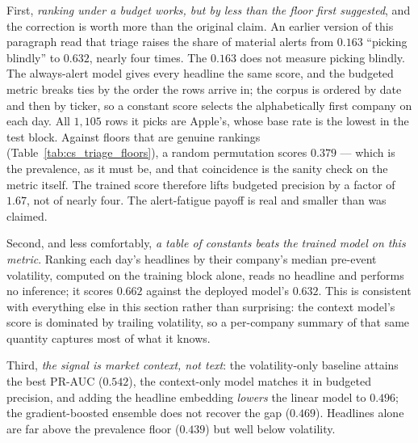 First, \emph{ranking under a budget works, but by less than the floor first suggested}, and the
correction is worth more than the original claim. An earlier version of this paragraph read that
triage raises the share of material alerts from $0.163$ ``picking blindly'' to $0.632$, nearly four
times. The $0.163$ does not measure picking blindly. The always-alert model gives every headline the
same score, and the budgeted metric breaks ties by the order the rows arrive in; the corpus is
ordered by date and then by ticker, so a constant score selects the alphabetically first company on
each day. All $1{,}105$ rows it picks are Apple's, whose base rate is the lowest in the test block.
Against floors that are genuine rankings (Table~\ref{tab:cs_triage_floors}), a random permutation
scores $0.379$ --- which is the prevalence, as it must be, and that coincidence is the sanity check
on the metric itself. The trained score therefore lifts budgeted precision by a factor of $1.67$,
not of nearly four. The alert-fatigue payoff is real and smaller than was claimed.

Second, and less comfortably, \emph{a table of constants beats the trained model on this metric}.
Ranking each day's headlines by their company's median pre-event volatility, computed on the
training block alone, reads no headline and performs no inference; it scores $0.662$ against the
deployed model's $0.632$. This is consistent with everything else in this section rather than
surprising: the context model's score is dominated by trailing volatility, so a per-company summary
of that same quantity captures most of what it knows.

Third, \emph{the signal is market context, not text}: the volatility-only baseline attains the best
PR-AUC ($0.542$), the context-only model matches it in budgeted precision, and adding the headline
embedding \emph{lowers} the linear model to $0.496$; the gradient-boosted ensemble does not recover
the gap ($0.469$). Headlines alone are far above the prevalence floor ($0.439$) but well below
volatility.

